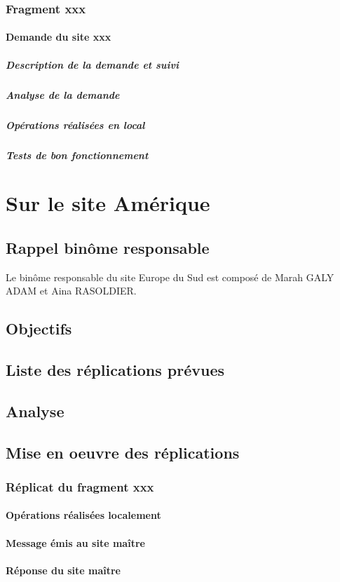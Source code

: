 \documentclass[10pt,a4paper,twoside]{article}
\begin{document}
\subsubsection{Fragment xxx}
\paragraph{Demande du site xxx}
\subparagraph{Description de la demande et suivi}
\subparagraph{Analyse de la demande}
\subparagraph{Opérations réalisées en local}
\subparagraph{Tests de bon fonctionnement}
\section{Sur le site Amérique}
\subsection{Rappel binôme responsable}
Le binôme responsable du site Europe du Sud est composé de Marah GALY ADAM et Aina RASOLDIER.
\subsection{Objectifs}
\subsection{Liste des réplications prévues}
\subsection{Analyse}
\subsection{Mise en oeuvre des réplications}
\subsubsection{Réplicat du fragment xxx}
\paragraph{Opérations réalisées localement}
\paragraph{Message émis au site maître}
\paragraph{Réponse du site maître}
\end{document}
